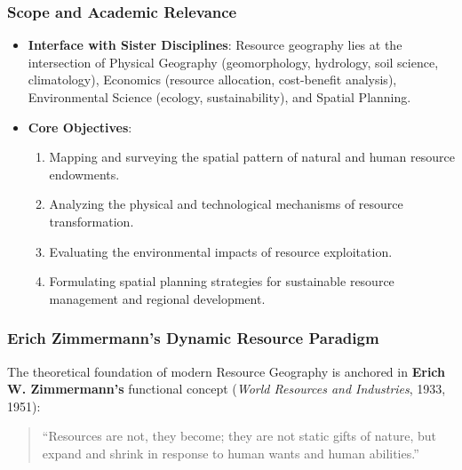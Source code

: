 \documentclass[11pt,a4paper]{article}
\begin{document}
\subsubsection{Scope and Academic Relevance}
\begin{itemize}[leftmargin=*]
  \item \textbf{Interface with Sister Disciplines}: Resource geography lies at the intersection of Physical Geography (geomorphology, hydrology, soil science, climatology), Economics (resource allocation, cost-benefit analysis), Environmental Science (ecology, sustainability), and Spatial Planning.
  \item \textbf{Core Objectives}:
  \begin{enumerate}
    \item Mapping and surveying the spatial pattern of natural and human resource endowments.
    \item Analyzing the physical and technological mechanisms of resource transformation.
    \item Evaluating the environmental impacts of resource exploitation.
    \item Formulating spatial planning strategies for sustainable resource management and regional development.
  \end{enumerate}
\end{itemize}

\subsubsection{Erich Zimmermann's Dynamic Resource Paradigm}
The theoretical foundation of modern Resource Geography is anchored in \textbf{Erich W. Zimmermann's} functional concept (\textit{World Resources and Industries}, 1933, 1951):
\begin{quote}
  ``Resources are not, they become; they are not static gifts of nature, but expand and shrink in response to human wants and human abilities.''
\end{quote}
\end{document}
